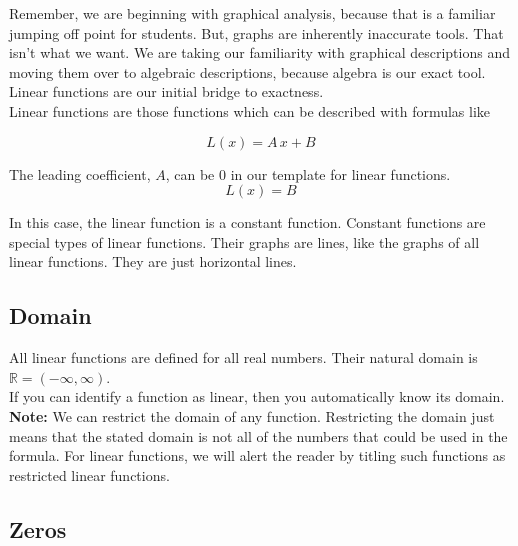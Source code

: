 \documentclass{ximera}
\begin{document}
Remember, we are beginning with graphical analysis, because that is a familiar jumping off point for students.  But, graphs are inherently inaccurate tools.  That isn't what we want. We are taking our familiarity with graphical descriptions and moving them over to algebraic descriptions, because algebra is our exact tool. \\

Linear functions are our initial bridge to exactness. \\


Linear functions are those functions which can be described with formulas like

\[
L(x) = A \, x + B 
\]



\begin{warning}

The leading coefficient, $A$, can be $0$ in our template for linear functions. \\

\[
L(x) = B 
\]

In this case, the linear function is a constant function.  Constant functions are special types of linear functions. Their graphs are lines, like the graphs of all linear functions.  They are just horizontal lines.

\end{warning}




\subsection*{Domain} 

All linear functions are defined for all real numbers.  Their natural domain is $\mathbb{R} = (-\infty, \infty)$. \\

If you can identify a function as linear, then you automatically know its domain. \\


\textbf{Note:}  We can restrict the domain of any function.  Restricting the domain just means that the stated domain is not all of the numbers that could be used in the formula.  For linear functions, we will alert the reader by titling such functions as restricted linear functions.\\







\subsection*{Zeros}
\end{document}
